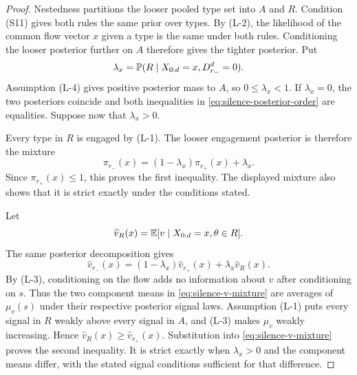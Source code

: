\begin{proof}
Nestedness partitions the looser pooled type set into $A$ and $R$. Condition (S11) gives both rules
the same prior over types. By (L-2), the likelihood of
the common flow vector $x$ given a type is the same under both rules. Conditioning the looser
posterior further on $A$ therefore gives the tighter posterior. Put
\[
  \lambda_x=\mathbb{P}(R\mid X_{0:d}=x,D_{r_-}^d=0).
\]
Assumption (L-4) gives positive posterior mass to $A$, so $0\le\lambda_x<1$. If
$\lambda_x=0$, the two posteriors coincide and both inequalities in
\eqref{eq:silence-posterior-order} are equalities. Suppose now that $\lambda_x>0$.

Every type in $R$ is engaged by (L-1). The looser engagement posterior is therefore the mixture
\[
  \pi_{r_-}(x)
  =(1-\lambda_x)\pi_{r_+}(x)+\lambda_x.
\]
Since $\pi_{r_+}(x)\le1$, this proves the first inequality. The displayed mixture also shows that
it is strict exactly under the conditions stated.

Let
\[
  \widehat v_R(x)=\mathbb{E}[v\mid X_{0:d}=x,\theta\in R].
\]
The same posterior decomposition gives
\begin{equation}
\label{eq:silence-v-mixture}
  \widehat v_{r_-}(x)
  =(1-\lambda_x)\widehat v_{r_+}(x)+\lambda_x\widehat v_R(x).
\end{equation}
By (L-3), conditioning on the flow adds no information about $v$ after conditioning on $s$.
Thus the two component means in \eqref{eq:silence-v-mixture} are averages of $\mu_v(s)$ under
their respective posterior signal laws. Assumption (L-1) puts every signal in $R$ weakly above
every signal in $A$, and (L-3) makes $\mu_v$ weakly increasing. Hence
$\widehat v_R(x)\ge\widehat v_{r_+}(x)$. Substitution into
\eqref{eq:silence-v-mixture} proves the second inequality. It is strict exactly when
$\lambda_x>0$ and the component means differ, with the stated signal conditions sufficient for
that difference.
\end{proof}

